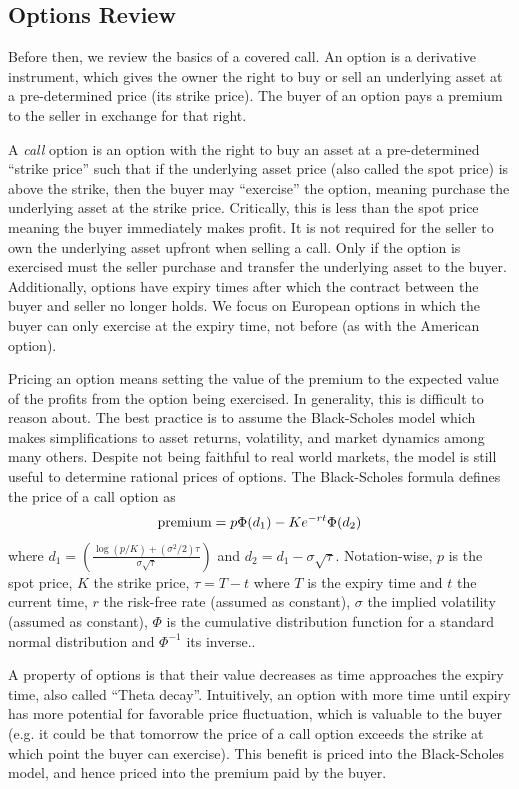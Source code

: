 \documentclass[hidelinks, 12pt]{article}
\begin{document}
\subsection{Options Review}
\label{sec:options}

Before then, we review the basics of a covered call. An option is a derivative instrument, which gives the owner the right to buy or sell an underlying asset at a pre-determined price (its strike price). The buyer of an option pays a premium to the seller in exchange for that right.

A \textit{call} option is an option with the right to buy an asset at a pre-determined ``strike price'' such that if the underlying asset price (also called the spot price) is above the strike, then the buyer may ``exercise'' the option, meaning purchase the underlying asset at the strike price. Critically, this is less than the spot price meaning the buyer immediately makes profit. It is not required for the seller to own the underlying asset upfront when selling a call. Only if the option is exercised must the seller purchase and transfer the underlying asset to the buyer. Additionally, options have expiry times after which the contract between the buyer and seller no longer holds. We focus on European options in which the buyer can only exercise at the expiry time, not before (as with the American option).

Pricing an option means setting the value of the premium to the expected value of the profits from the option being exercised. In generality, this is difficult to  reason about. The best practice is to assume the  Black-Scholes model which makes simplifications to asset returns, volatility, and market dynamics among many others. Despite not being faithful to real world markets, the model is still useful to determine rational prices of options. The Black-Scholes formula defines the price of a call option as
\[\textup{premium} = p \Phi(d_1) - K e^{-rt} \Phi(d_2)\]
where $d_1 = \left( \frac{\log(p/K) + (\sigma^2/2)\tau}{\sigma\sqrt{\tau}}\right)$ and $d_2 = d_1 - \sigma\sqrt{\tau}$. Notation-wise, $p$ is the spot price, $K$ the strike price, $\tau = T-t$ where $T$ is the expiry time and $t$ the current time, $r$ the risk-free rate (assumed as constant), $\sigma$ the implied volatility (assumed as constant), $\Phi$ is the cumulative distribution function for a standard normal distribution and $\Phi^{-1}$ its inverse..

A property of options is that their value decreases as time approaches the expiry time, also called ``Theta decay''. Intuitively, an option with more time until expiry has more potential for favorable price fluctuation, which is valuable to the buyer (e.g. it could be that tomorrow the price of a call option exceeds the strike at which point the buyer can exercise). This benefit is priced into the Black-Scholes model, and hence priced into the premium paid by the buyer.
\end{document}
